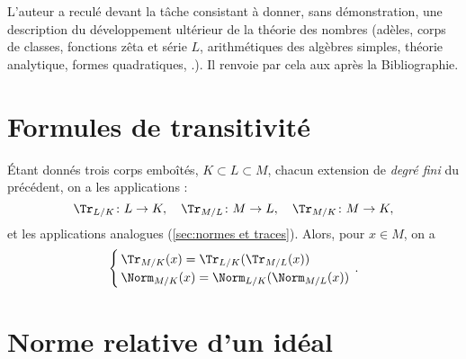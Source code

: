\documentclass[11pt, %
  title in boldface,
  theorem in new line,
  theorem numbering = section,
  number theorems separately,
  simple name,
]{beaulivre}
\begin{document}
L'auteur a reculé devant la tâche consistant à donner, sans démonstration, une description du développement ultérieur de la théorie des nombres (adèles, corps de classes, fonctions zêta et série \( L \), arithmétiques des algèbres simples, théorie analytique, formes quadratiques, \etc.). Il renvoie par cela aux  après la Bibliographie.

\section*{Formules de transitivité}

    Étant donnés trois corps emboîtés, \( K \subset L \subset M \), chacun extension de \emph{degré fini} du précédent, on a les applications  :
    \[
        \Tr_{L/K} \colon L \to K, \quad
        \Tr_{M/L} \colon M \to L, \quad
        \Tr_{M/K} \colon M \to K,
    \]
    et les applications  analogues (\cref{sec:normes et traces}). Alors, pour \( x \in M \), on a
    \begin{equation}
        \begin{cases}
            \, \Tr_{M/K}(x) = \Tr_{L/K}(\Tr_{M/L}(x))\\
            \, \Norm_{M/K}(x) = \Norm_{L/K}(\Norm_{M/L}(x))
        \end{cases}
        \!\!\!\!\!.
    \end{equation}

\section*{Norme relative d'un idéal}
\end{document}
